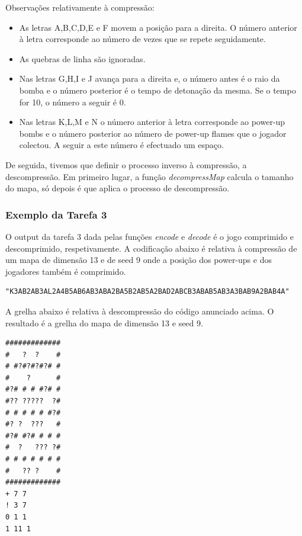 \documentclass[a4paper]{article}
\begin{document}
\vspace{0.5cm}

Observações relativamente à compressão:

\begin{itemize}
      \item As letras A,B,C,D,E e F movem a posição para a direita. O número anterior à letra corresponde ao número de vezes que se repete seguidamente.
      \item As quebras de linha são ignoradas.
      \item Nas letras G,H,I e J avança para a direita e, o número antes é o raio da bomba e o número posterior é o tempo de detonação da mesma. Se o tempo for 10, o número a seguir é 0.
      \item Nas letras K,L,M e N o número anterior à letra corresponde ao power-up bombs e o número posterior ao número de power-up flames que o jogador colectou. A seguir a este número é efectuado um espaço.
\end{itemize}

\vspace{0.5cm}

De seguida, tivemos que definir o processo inverso à compressão, a descompressão. Em primeiro lugar, a função \emph{decompressMap} calcula o tamanho do mapa, só depois é que aplica o processo de descompressão. 

\subsubsection{Exemplo da Tarefa 3}

O output da tarefa 3 dada pelas funções \emph{encode} e \emph{decode} é o jogo comprimido e descomprimido, respetivamente. A codificação abaixo é relativa à compressão de um mapa de dimensão 13 e de seed 9 onde a posição dos power-ups e dos jogadores também é comprimido.
\begin{verbatim}
"K3AB2AB3AL2A4B5AB6AB3ABA2BA5B2AB5A2BAD2ABCB3ABAB5AB3A3BAB9A2BAB4A"
\end{verbatim}

\newpage

A grelha abaixo é relativa à descompressão do código anunciado acima. O resultado é a grelha do mapa de dimensão 13 e seed 9.

\begin{verbatim}
#############
#   ?  ?    #
# #?#?#?#?# #
#    ?      #
#?# # # #?# #
#?? ?????  ?#
# # # # # #?#
#? ?  ???   #
#?# #?# # # #
#  ?   ??? ?#
# # # # # # #
#   ?? ?    #
#############
+ 7 7
! 3 7
0 1 1
1 11 1
\end{verbatim}
\end{document}
